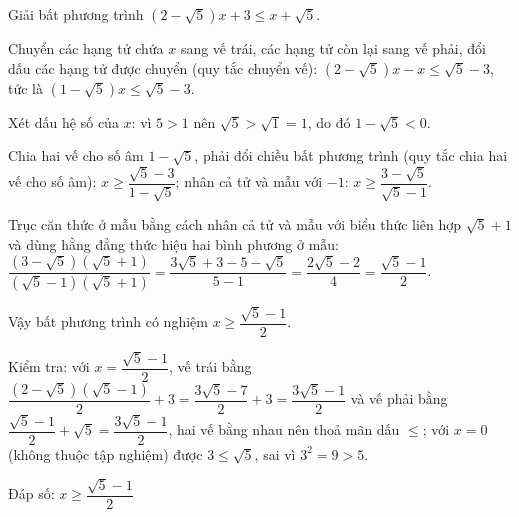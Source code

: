 \begin{problem}[9DS-BPT-026]
Giải bất phương trình $(2 - \sqrt{5})x + 3 \leq x + \sqrt{5}$.

\begin{solution}
Chuyển các hạng tử chứa $x$ sang vế trái, các hạng tử còn lại sang vế phải, đổi dấu các hạng tử được chuyển (quy tắc chuyển vế): $(2 - \sqrt{5})x - x \leq \sqrt{5} - 3$, tức là $(1 - \sqrt{5})x \leq \sqrt{5} - 3$.

Xét dấu hệ số của $x$: vì $5 > 1$ nên $\sqrt{5} > \sqrt{1} = 1$, do đó $1 - \sqrt{5} < 0$.

Chia hai vế cho số âm $1 - \sqrt{5}$, phải đổi chiều bất phương trình (quy tắc chia hai vế cho số âm): $x \geq \dfrac{\sqrt{5} - 3}{1 - \sqrt{5}}$; nhân cả tử và mẫu với $-1$: $x \geq \dfrac{3 - \sqrt{5}}{\sqrt{5} - 1}$.

Trục căn thức ở mẫu bằng cách nhân cả tử và mẫu với biểu thức liên hợp $\sqrt{5} + 1$ và dùng hằng đẳng thức hiệu hai bình phương ở mẫu: $\dfrac{(3 - \sqrt{5})(\sqrt{5} + 1)}{(\sqrt{5} - 1)(\sqrt{5} + 1)} = \dfrac{3\sqrt{5} + 3 - 5 - \sqrt{5}}{5 - 1} = \dfrac{2\sqrt{5} - 2}{4} = \dfrac{\sqrt{5} - 1}{2}$.

Vậy bất phương trình có nghiệm $x \geq \dfrac{\sqrt{5} - 1}{2}$.

Kiểm tra: với $x = \dfrac{\sqrt{5} - 1}{2}$, vế trái bằng $\dfrac{(2 - \sqrt{5})(\sqrt{5} - 1)}{2} + 3 = \dfrac{3\sqrt{5} - 7}{2} + 3 = \dfrac{3\sqrt{5} - 1}{2}$ và vế phải bằng $\dfrac{\sqrt{5} - 1}{2} + \sqrt{5} = \dfrac{3\sqrt{5} - 1}{2}$, hai vế bằng nhau nên thoả mãn dấu $\leq$; với $x = 0$ (không thuộc tập nghiệm) được $3 \leq \sqrt{5}$, sai vì $3^2 = 9 > 5$.

Đáp số: $\boxed{x \geq \dfrac{\sqrt{5} - 1}{2}}$
\end{solution}
\end{problem}

